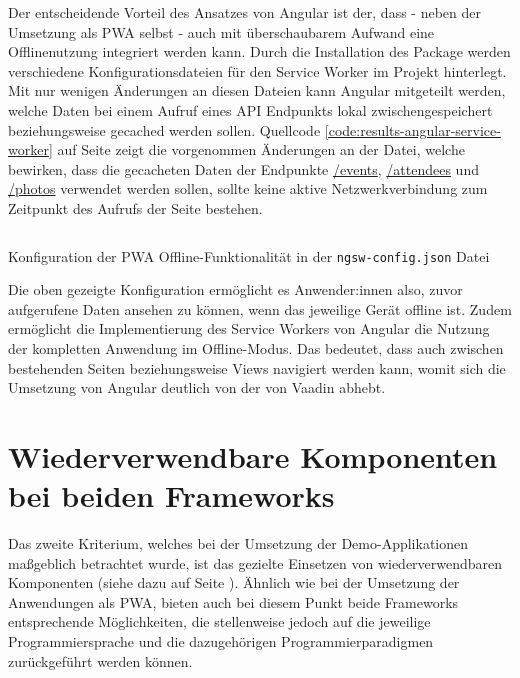 \documentclass[a4paper,12pt,twoside]{scrreprt}
\begin{document}
Der entscheidende Vorteil des Ansatzes von Angular ist der, dass - neben der Umsetzung als \ac{PWA} selbst - auch mit überschaubarem Aufwand eine Offlinenutzung integriert werden kann. Durch die Installation des  Package werden verschiedene Konfigurationsdateien für den Service Worker im Projekt hinterlegt. Mit nur wenigen Änderungen an diesen Dateien kann Angular mitgeteilt werden, welche Daten bei einem Aufruf eines API Endpunkts lokal zwischengespeichert beziehungsweise gecached werden sollen. Quellcode \ref{code:results-angular-service-worker} auf Seite \pageref{code:results-angular-service-worker} zeigt die vorgenommen Änderungen an der  Datei, welche bewirken, dass die gecacheten Daten der Endpunkte \url{/events}, \url{/attendees} und \url{/photos} verwendet werden sollen, sollte keine aktive Netzwerkverbindung zum Zeitpunkt des Aufrufs der Seite bestehen.

\begin{listing}[ht]
    \renewcommand{\fcolorbox}[4][]{#4}
    \inputminted[fontsize=\footnotesize,linenos,breaklines]{json}{code/Luidold_Results-Angular-ServiceWorker.json}
    \caption[Konfiguration der \ac{PWA} Offline-Funktionalität in der \texttt{ngsw-config.json} Datei]{Konfiguration der \ac{PWA} Offline-Funktionalität in der \texttt{ngsw-config.json} Datei}
    \label{code:results-angular-service-worker}
\end{listing}

Die oben gezeigte Konfiguration ermöglicht es Anwender:innen also, zuvor aufgerufene Daten ansehen zu können, wenn das jeweilige Gerät offline ist. Zudem ermöglicht die Implementierung des Service Workers von Angular die Nutzung der kompletten Anwendung im Offline-Modus. Das bedeutet, dass auch zwischen bestehenden Seiten beziehungsweise Views navigiert werden kann, womit sich die Umsetzung von Angular deutlich von der von Vaadin abhebt.

\section{Wiederverwendbare Komponenten bei beiden Frameworks}
\label{sec:ergebnisse-wiederverwendbarkeit}
Das zweite Kriterium, welches bei der Umsetzung der Demo-Applikationen maßgeblich betrachtet wurde, ist das gezielte Einsetzen von wiederverwendbaren Komponenten (siehe dazu \textit{} auf Seite \pageref{sub-sec:kriterien-web-components}). Ähnlich wie bei der Umsetzung der Anwendungen als \ac{PWA}, bieten auch bei diesem Punkt beide Frameworks entsprechende Möglichkeiten, die stellenweise jedoch auf die jeweilige Programmiersprache und die dazugehörigen Programmierparadigmen zurückgeführt werden können.
\end{document}
